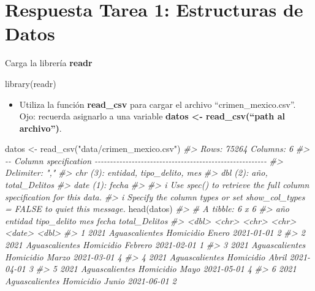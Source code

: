 \documentclass[
]{book}
\newenvironment{Shaded}{\begin{snugshade}}{\end{snugshade}}
\newcommand{\CommentTok}[1]{\textcolor[rgb]{0.56,0.35,0.01}{\textit{#1}}}
\newcommand{\FunctionTok}[1]{\textcolor[rgb]{0.00,0.00,0.00}{#1}}
\newcommand{\NormalTok}[1]{#1}
\newcommand{\OtherTok}[1]{\textcolor[rgb]{0.56,0.35,0.01}{#1}}
\newcommand{\StringTok}[1]{\textcolor[rgb]{0.31,0.60,0.02}{#1}}
\providecommand{\tightlist}{%
  \setlength{\itemsep}{0pt}\setlength{\parskip}{0pt}}
\begin{document}
\hypertarget{respuesta-tarea-1-estructuras-de-datos}{%
\section{Respuesta Tarea 1: Estructuras de Datos}\label{respuesta-tarea-1-estructuras-de-datos}}

Carga la librería \textbf{readr}

\begin{Shaded}
\begin{Highlighting}[]
\FunctionTok{library}\NormalTok{(readr)}
\end{Highlighting}
\end{Shaded}

\begin{itemize}
\tightlist
\item
  Utiliza la función \textbf{read\_csv} para cargar el archivo ``crimen\_mexico.csv''. Ojo: recuerda asignarlo a una variable \textbf{datos \textless- read\_csv(``path al archivo'')}.
\end{itemize}

\begin{Shaded}
\begin{Highlighting}[]
\NormalTok{datos }\OtherTok{\textless{}{-}} \FunctionTok{read\_csv}\NormalTok{(}\StringTok{"data/crimen\_mexico.csv"}\NormalTok{)}
\CommentTok{\#\textgreater{} Rows: 75264 Columns: 6}
\CommentTok{\#\textgreater{} {-}{-} Column specification {-}{-}{-}{-}{-}{-}{-}{-}{-}{-}{-}{-}{-}{-}{-}{-}{-}{-}{-}{-}{-}{-}{-}{-}{-}{-}{-}{-}{-}{-}{-}{-}{-}{-}{-}{-}{-}{-}{-}{-}{-}{-}{-}{-}{-}{-}{-}{-}{-}{-}{-}{-}{-}{-}{-}{-}}
\CommentTok{\#\textgreater{} Delimiter: ","}
\CommentTok{\#\textgreater{} chr  (3): entidad, tipo\_delito, mes}
\CommentTok{\#\textgreater{} dbl  (2): año, total\_Delitos}
\CommentTok{\#\textgreater{} date (1): fecha}
\CommentTok{\#\textgreater{} }
\CommentTok{\#\textgreater{} i Use \textasciigrave{}spec()\textasciigrave{} to retrieve the full column specification for this data.}
\CommentTok{\#\textgreater{} i Specify the column types or set \textasciigrave{}show\_col\_types = FALSE\textasciigrave{} to quiet this message.}
\FunctionTok{head}\NormalTok{(datos)}
\CommentTok{\#\textgreater{} \# A tibble: 6 x 6}
\CommentTok{\#\textgreater{}     año entidad        tipo\_delito mes     fecha      total\_Delitos}
\CommentTok{\#\textgreater{}   \textless{}dbl\textgreater{} \textless{}chr\textgreater{}          \textless{}chr\textgreater{}       \textless{}chr\textgreater{}   \textless{}date\textgreater{}             \textless{}dbl\textgreater{}}
\CommentTok{\#\textgreater{} 1  2021 Aguascalientes Homicidio   Enero   2021{-}01{-}01             2}
\CommentTok{\#\textgreater{} 2  2021 Aguascalientes Homicidio   Febrero 2021{-}02{-}01             1}
\CommentTok{\#\textgreater{} 3  2021 Aguascalientes Homicidio   Marzo   2021{-}03{-}01             4}
\CommentTok{\#\textgreater{} 4  2021 Aguascalientes Homicidio   Abril   2021{-}04{-}01             3}
\CommentTok{\#\textgreater{} 5  2021 Aguascalientes Homicidio   Mayo    2021{-}05{-}01             4}
\CommentTok{\#\textgreater{} 6  2021 Aguascalientes Homicidio   Junio   2021{-}06{-}01             2}
\end{Highlighting}
\end{Shaded}
\end{document}
